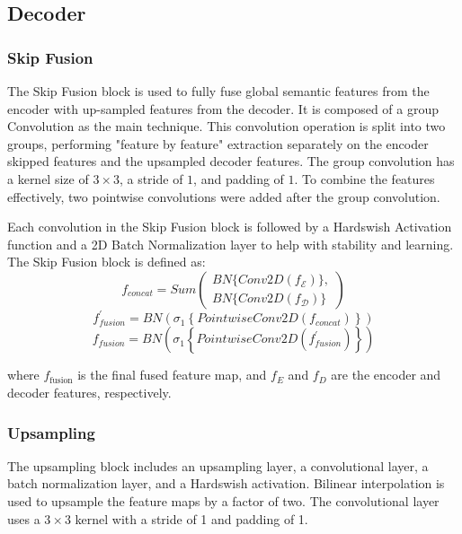 \documentclass[lettersize,journal]{IEEEtran}
\begin{document}
\subsection{Decoder}
\subsubsection{Skip Fusion}
The Skip Fusion block is used to fully fuse global semantic features from the encoder with up-sampled features from the decoder. It is composed of a group Convolution as the main technique. This convolution operation is split into two groups, performing "feature by feature" extraction separately on the encoder skipped features and the upsampled decoder features. The group convolution has a kernel size of $3 \times 3$, a stride of $1$, and padding of $1$. To combine the features effectively, two pointwise convolutions were added after the group convolution. 

Each convolution in the Skip Fusion block is followed by a Hardswish Activation function and a 2D Batch Normalization layer to help with stability and learning. The Skip Fusion block is defined as:
\begin{equation}
f_{concat}=Sum{
\left(
\begin{array}{l}
BN{\{}Conv2D(f_{\mathcal{E}}){\}}, \\
BN{\{}Conv2D(f_{\mathcal{D}}){\}}
\end{array} 
\right)
}
\end{equation}
\begin{equation}
f_{fusion}^{\prime}=BN\left(\sigma_1\left\{PointwiseConv2D\left(f_{concat}\right)\right\}\right)
\end{equation}
\begin{equation}
f_{fusion}=BN\left(\sigma_1\left\{PointwiseConv2D\left(f_{fusion}^{\prime}\right)\right\}\right)
\end{equation}

where $f_{\text{fusion}}$ is the final fused feature map, and $f_E$ and $f_D$ are the encoder and decoder features, respectively.

\subsubsection{Upsampling}
The upsampling block includes an upsampling layer, a convolutional layer, a batch normalization layer, and a Hardswish activation. Bilinear interpolation is used to upsample the feature maps by a factor of two. The convolutional layer uses a $3 \times 3$ kernel with a stride of 1 and padding of 1.
\end{document}
